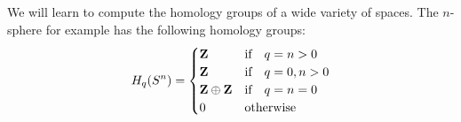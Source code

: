 
We will learn to compute the homology groups of a wide variety of spaces. 
The $n$-sphere for example has the following homology groups:
\[
H_q(S^n)=\begin{cases}\mathbf Z & \hbox{if}\quad q=n>0\\
                \mathbf Z & \hbox{if}\quad q=0,n>0\\
                \mathbf Z\oplus\mathbf Z & \hbox{if}\quad q=n=0\\
                0 & \hbox{otherwise}
\end{cases}
\]





